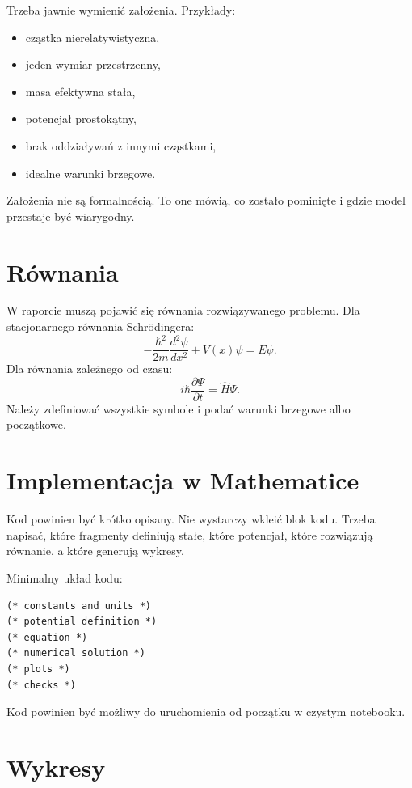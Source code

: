 Trzeba jawnie wymienić założenia. Przykłady:
\begin{itemize}
    \item cząstka nierelatywistyczna,
    \item jeden wymiar przestrzenny,
    \item masa efektywna stała,
    \item potencjał prostokątny,
    \item brak oddziaływań z innymi cząstkami,
    \item idealne warunki brzegowe.
\end{itemize}
Założenia nie są formalnością. To one mówią, co zostało pominięte i gdzie model przestaje być wiarygodny.

\section{Równania}

W raporcie muszą pojawić się równania rozwiązywanego problemu. Dla stacjonarnego równania Schrödingera:
\begin{equation}
    -\frac{\hbar^2}{2m}\frac{d^2\psi}{dx^2}+V(x)\psi=E\psi.
\end{equation}
Dla równania zależnego od czasu:
\begin{equation}
    i\hbar\frac{\partial\Psi}{\partial t}=\hat{H}\Psi.
\end{equation}
Należy zdefiniować wszystkie symbole i podać warunki brzegowe albo początkowe.

\section{Implementacja w Mathematice}

Kod powinien być krótko opisany. Nie wystarczy wkleić blok kodu. Trzeba napisać, które fragmenty definiują stałe, które potencjał, które rozwiązują równanie, a które generują wykresy.

Minimalny układ kodu:
\begin{verbatim}
(* constants and units *)
(* potential definition *)
(* equation *)
(* numerical solution *)
(* plots *)
(* checks *)
\end{verbatim}
Kod powinien być możliwy do uruchomienia od początku w czystym notebooku.

\section{Wykresy}

